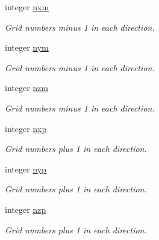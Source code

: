 \textbf{ }\par
\begin{DoxyCompactItemize}
\item 
integer \mbox{\hyperlink{namespacemodule__global_ae76c3b71a1e513d542e7c22fbba06dd5}{nxm}}
\begin{DoxyCompactList}\small\item\em Grid numbers minus 1 in each direction. \end{DoxyCompactList}\item 
integer \mbox{\hyperlink{namespacemodule__global_abe5a3dedbee692c61acb0614f80d7584}{nym}}
\begin{DoxyCompactList}\small\item\em Grid numbers minus 1 in each direction. \end{DoxyCompactList}\item 
integer \mbox{\hyperlink{namespacemodule__global_a267d58e2cb3e1d5869114102f99fa203}{nzm}}
\begin{DoxyCompactList}\small\item\em Grid numbers minus 1 in each direction. \end{DoxyCompactList}\end{DoxyCompactItemize}

\textbf{ }\par
\begin{DoxyCompactItemize}
\item 
integer \mbox{\hyperlink{namespacemodule__global_a46d777f91db627ffda250b59c2ace26f}{nxp}}
\begin{DoxyCompactList}\small\item\em Grid numbers plus 1 in each direction. \end{DoxyCompactList}\item 
integer \mbox{\hyperlink{namespacemodule__global_ac5231664c2f5fe4f769a06df674e4292}{nyp}}
\begin{DoxyCompactList}\small\item\em Grid numbers plus 1 in each direction. \end{DoxyCompactList}\item 
integer \mbox{\hyperlink{namespacemodule__global_a8ceb9b0d81231e3a40bfc849fd7b2a4f}{nzp}}
\begin{DoxyCompactList}\small\item\em Grid numbers plus 1 in each direction. \end{DoxyCompactList}\end{DoxyCompactItemize}

